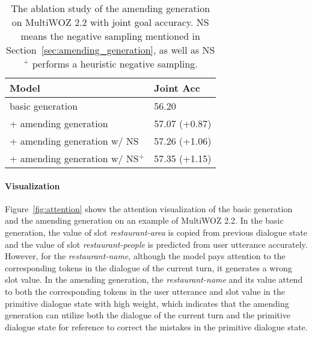 \documentclass[11pt]{article}
\begin{document}
\begin{table}
\centering
\small
\begin{tabular}{ll}
\hline
\textbf{Model} & \textbf{Joint Acc} \\
\hline
\hline
basic generation & 56.20 \\
\hline
\quad + amending generation & 57.07 (+0.87) \\
\quad + amending generation w/ NS & 57.26 (+1.06) \\
\quad + amending generation w/ NS$^+$ & 57.35 (+1.15) \\
\hline
\end{tabular}
\caption{The ablation study of the amending generation on MultiWOZ 2.2 with joint goal accuracy. NS means the negative sampling mentioned in Section~\ref{sec:amending_generation}, as well as NS$^+$ performs a heuristic negative sampling.}\label{tab:ablation-amend}
\end{table}

\paragraph{Visualization} Figure~\ref{fig:attention} shows the attention visualization of the basic generation and the amending generation on an example of MultiWOZ 2.2. In the basic generation, the value of slot \textit{restaurant-area} is copied from previous dialogue state and the value of slot \textit{restaurant-people} is predicted from user utterance accurately. However, for the \textit{restaurant-name}, although the model pays attention to the corresponding tokens in the dialogue of the current turn, it generates a wrong slot value. In the amending generation, the \textit{restaurant-name} and its value attend to both the corresponding tokens in the user utterance and slot value in the primitive dialogue state with high weight, which indicates that the amending generation can utilize both the dialogue of the current turn and the primitive dialogue state for reference to correct the mistakes in the primitive dialogue state.
\end{document}
